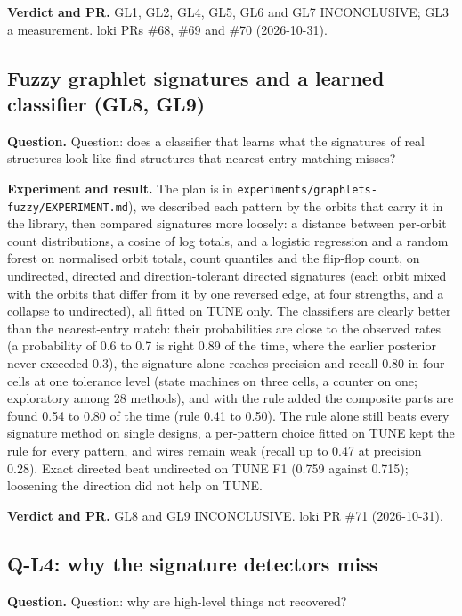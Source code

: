 \documentclass[conference]{IEEEtran}
\newcommand{\hev}[1]{\par\smallskip\noindent\textbf{#1}}
\newcommand{\code}[1]{\texttt{#1}}
\begin{document}
\hev{Verdict and PR.} GL1, GL2, GL4, GL5, GL6 and GL7 INCONCLUSIVE; GL3 a measurement. loki PRs \#68, \#69 and \#70 (2026-10-31).

\subsection{Fuzzy graphlet signatures and a learned classifier (GL8, GL9)}
\label{rec:fuzzy}

\hev{Question.} Question: does a classifier that learns what the signatures of real structures look like find structures that nearest-entry matching misses?

\hev{Experiment and result.} The plan is in \code{experiments/graphlets-fuzzy/EXPERIMENT.md}), we described each pattern by the
orbits that carry it in the library, then compared signatures more loosely: a distance between per-orbit count distributions, a cosine of log totals, and
a logistic regression and a random forest on normalised orbit totals, count quantiles and the flip-flop count, on undirected, directed and
direction-tolerant directed signatures (each orbit mixed with the orbits that differ from it by one reversed edge, at four strengths, and a collapse to undirected),
all fitted on TUNE only. The classifiers are clearly better than the nearest-entry match: their probabilities are close to the observed rates
(a probability of 0.6 to 0.7 is right 0.89 of the time, where the earlier posterior never exceeded 0.3), the signature alone reaches precision and recall 0.80 in
four cells at one tolerance level (state machines on three cells, a counter on one; exploratory among 28 methods), and with the rule added the composite parts are found
0.54 to 0.80 of the time (rule 0.41 to 0.50). The rule alone still beats every signature method on single designs, a per-pattern choice fitted on TUNE kept the rule
for every pattern, and wires remain weak (recall up to 0.47 at precision 0.28). Exact directed beat undirected on TUNE F1 (0.759 against 0.715); loosening the direction
did not help on TUNE.

\hev{Verdict and PR.} GL8 and GL9 INCONCLUSIVE. loki PR \#71 (2026-10-31).

\subsection{Q-L4: why the signature detectors miss}
\label{rec:ql4}

\hev{Question.} Question: why are high-level things not recovered?
\end{document}
